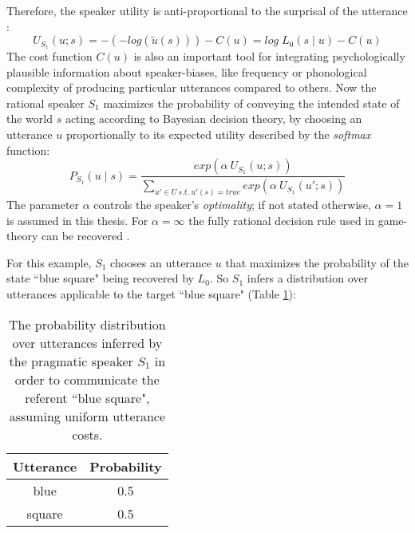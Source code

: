 Therefore, the speaker utility is anti-proportional to the surprisal of the utterance \parencite{frank2012predicting}:
\begin{equation}
U_{S_1} (u;s) = -(-log(\tilde{u}(s))) - C(u) = log \; L_0(s \mid u) - C(u)
\end{equation}
The cost function $C(u)$ is also an important tool for integrating psychologically plausible information about speaker-biases, like frequency or phonological complexity of producing particular utterances compared to others. Now the rational speaker $S_1$ maximizes the probability of conveying the intended state of the world $s$ acting according to Bayesian decision theory, by choosing an utterance $u$ proportionally to its expected utility described by the \emph{softmax} function:
\begin{equation}
P_{S_1}(u \mid s) = \frac{exp(\alpha \: U_{S_1} (u; s))}{\sum_{u' \in U~s.t.~u'(s) = true} exp(\alpha \: U_{S_1} (u'; s))}
\end{equation}
The parameter $\alpha$ controls the speaker's \emph{optimality}; if not stated otherwise, $\alpha = 1$ is assumed in this thesis. For $\alpha = \infty $ the fully rational decision rule used in game-theory can be recovered \parencite{problang, lassiter2017adjectival}.

For this example, $S_1$ chooses an utterance $u$ that maximizes the probability of the state ``blue square" being recovered by $L_0$. So $S_1$ infers a distribution over utterances applicable to the target ``blue square" (Table \ref{rsa-s1}):

\begin{table}[h]
	\begin{center}
		\caption{The probability distribution over utterances inferred by the pragmatic speaker $S_1$ in order to communicate the referent ``blue square", assuming uniform utterance costs.}
		\label{rsa-s1}
		\vskip 0.12in
		\begin{tabular}{cc}
			Utterance & Probability \\
			\hline
			blue & 0.5 \\
			square & 0.5
		\end{tabular}
	\end{center}
\end{table}
 
